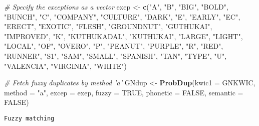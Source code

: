 \documentclass[
]{article}
\newenvironment{Shaded}{\begin{snugshade}}{\end{snugshade}}
\newcommand{\CommentTok}[1]{\textcolor[rgb]{0.56,0.35,0.01}{\textit{#1}}}
\newcommand{\DataTypeTok}[1]{\textcolor[rgb]{0.13,0.29,0.53}{#1}}
\newcommand{\KeywordTok}[1]{\textcolor[rgb]{0.13,0.29,0.53}{\textbf{#1}}}
\newcommand{\NormalTok}[1]{#1}
\newcommand{\OtherTok}[1]{\textcolor[rgb]{0.56,0.35,0.01}{#1}}
\newcommand{\StringTok}[1]{\textcolor[rgb]{0.31,0.60,0.02}{#1}}
\begin{document}
\begin{Shaded}
\begin{Highlighting}[]
\CommentTok{# Specify the exceptions as a vector}
\NormalTok{exep <-}\StringTok{ }\KeywordTok{c}\NormalTok{(}\StringTok{"A"}\NormalTok{, }\StringTok{"B"}\NormalTok{, }\StringTok{"BIG"}\NormalTok{, }\StringTok{"BOLD"}\NormalTok{, }\StringTok{"BUNCH"}\NormalTok{, }\StringTok{"C"}\NormalTok{, }\StringTok{"COMPANY"}\NormalTok{, }\StringTok{"CULTURE"}\NormalTok{,}
         \StringTok{"DARK"}\NormalTok{, }\StringTok{"E"}\NormalTok{, }\StringTok{"EARLY"}\NormalTok{, }\StringTok{"EC"}\NormalTok{, }\StringTok{"ERECT"}\NormalTok{, }\StringTok{"EXOTIC"}\NormalTok{, }\StringTok{"FLESH"}\NormalTok{, }\StringTok{"GROUNDNUT"}\NormalTok{,}
         \StringTok{"GUTHUKAI"}\NormalTok{, }\StringTok{"IMPROVED"}\NormalTok{, }\StringTok{"K"}\NormalTok{, }\StringTok{"KUTHUKADAL"}\NormalTok{, }\StringTok{"KUTHUKAI"}\NormalTok{, }\StringTok{"LARGE"}\NormalTok{,}
         \StringTok{"LIGHT"}\NormalTok{, }\StringTok{"LOCAL"}\NormalTok{, }\StringTok{"OF"}\NormalTok{, }\StringTok{"OVERO"}\NormalTok{, }\StringTok{"P"}\NormalTok{, }\StringTok{"PEANUT"}\NormalTok{, }\StringTok{"PURPLE"}\NormalTok{, }\StringTok{"R"}\NormalTok{,}
         \StringTok{"RED"}\NormalTok{, }\StringTok{"RUNNER"}\NormalTok{, }\StringTok{"S1"}\NormalTok{, }\StringTok{"SAM"}\NormalTok{, }\StringTok{"SMALL"}\NormalTok{, }\StringTok{"SPANISH"}\NormalTok{, }\StringTok{"TAN"}\NormalTok{, }\StringTok{"TYPE"}\NormalTok{,}
         \StringTok{"U"}\NormalTok{, }\StringTok{"VALENCIA"}\NormalTok{, }\StringTok{"VIRGINIA"}\NormalTok{, }\StringTok{"WHITE"}\NormalTok{)}

\CommentTok{# Fetch fuzzy duplicates by method 'a'}
\NormalTok{GNdup <-}\StringTok{ }\KeywordTok{ProbDup}\NormalTok{(}\DataTypeTok{kwic1 =}\NormalTok{ GNKWIC, }\DataTypeTok{method =} \StringTok{"a"}\NormalTok{, }\DataTypeTok{excep =}\NormalTok{ exep, }\DataTypeTok{fuzzy =} \OtherTok{TRUE}\NormalTok{,}
                 \DataTypeTok{phonetic =} \OtherTok{FALSE}\NormalTok{, }\DataTypeTok{semantic =} \OtherTok{FALSE}\NormalTok{)}
\end{Highlighting}
\end{Shaded}

\begin{verbatim}
Fuzzy matching
\end{verbatim}
\end{document}
